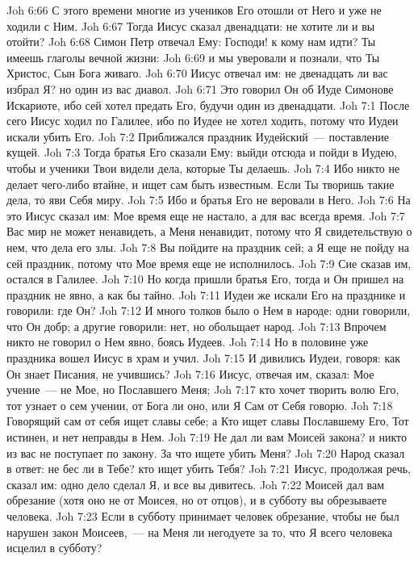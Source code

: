 \vs Joh 6:66 С этого времени многие из учеников Его отошли от Него и уже не ходили с Ним.
\vs Joh 6:67 Тогда Иисус сказал двенадцати: не хотите ли и вы отойти?
\vs Joh 6:68 Симон Петр отвечал Ему: Господи! к кому нам идти? Ты имеешь глаголы вечной жизни:
\vs Joh 6:69 и мы уверовали и познали, что Ты Христос, Сын Бога живаго.
\vs Joh 6:70 Иисус отвечал им: не двенадцать ли вас избрал Я? но один из вас диавол.
\vs Joh 6:71 Это говорил Он об Иуде Симонове Искариоте, ибо сей хотел предать Его, будучи один из двенадцати.
\vs Joh 7:1 После сего Иисус ходил по Галилее, ибо по Иудее не хотел ходить, потому что Иудеи искали убить Его.
\rsbpar\vs Joh 7:2 Приближался праздник Иудейский~--- поставление кущей.
\vs Joh 7:3 Тогда братья Его сказали Ему: выйди отсюда и пойди в Иудею, чтобы и ученики Твои видели дела, которые Ты делаешь.
\vs Joh 7:4 Ибо никто не делает чего-либо втайне, и ищет сам быть известным. Если Ты творишь такие дела, то яви Себя миру.
\vs Joh 7:5 Ибо и братья Его не веровали в Него.
\vs Joh 7:6 На это Иисус сказал им: Мое время еще не настало, а для вас всегда время.
\vs Joh 7:7 Вас мир не может ненавидеть, а Меня ненавидит, потому что Я свидетельствую о нем, что дела его злы.
\vs Joh 7:8 Вы пойдите на праздник сей; а Я еще не пойду на сей праздник, потому что Мое время еще не исполнилось.
\vs Joh 7:9 Сие сказав им, остался в Галилее.
\rsbpar\vs Joh 7:10 Но когда пришли братья Его, тогда и Он пришел на праздник не явно, а как бы тайно.
\vs Joh 7:11 Иудеи же искали Его на празднике и говорили: где Он?
\vs Joh 7:12 И много толков было о Нем в народе: одни говорили, что Он добр; а другие говорили: нет, но обольщает народ.
\vs Joh 7:13 Впрочем никто не говорил о Нем явно, боясь Иудеев.
\vs Joh 7:14 Но в половине уже праздника вошел Иисус в храм и учил.
\vs Joh 7:15 И дивились Иудеи, говоря: как Он знает Писания, не учившись?
\vs Joh 7:16 Иисус, отвечая им, сказал: Мое учение~--- не Мое, но Пославшего Меня;
\vs Joh 7:17 кто хочет творить волю Его, тот узнает о сем учении, от Бога ли оно, или Я Сам от Себя говорю.
\vs Joh 7:18 Говорящий сам от себя ищет славы себе; а Кто ищет славы Пославшему Его, Тот истинен, и нет неправды в Нем.
\vs Joh 7:19 Не дал ли вам Моисей закона? и никто из вас не поступает по закону. За что ищете убить Меня?
\vs Joh 7:20 Народ сказал в ответ: не бес ли в Тебе? кто ищет убить Тебя?
\vs Joh 7:21 Иисус, продолжая речь, сказал им: одно дело сделал Я, и все вы дивитесь.
\vs Joh 7:22 Моисей дал вам обрезание (хотя оно не от Моисея, но от отцов), и в субботу вы обрезываете человека.
\vs Joh 7:23 Если в субботу принимает человек обрезание, чтобы не был нарушен закон Моисеев,~--- на Меня ли негодуете за то, что Я всего человека исцелил в субботу?
